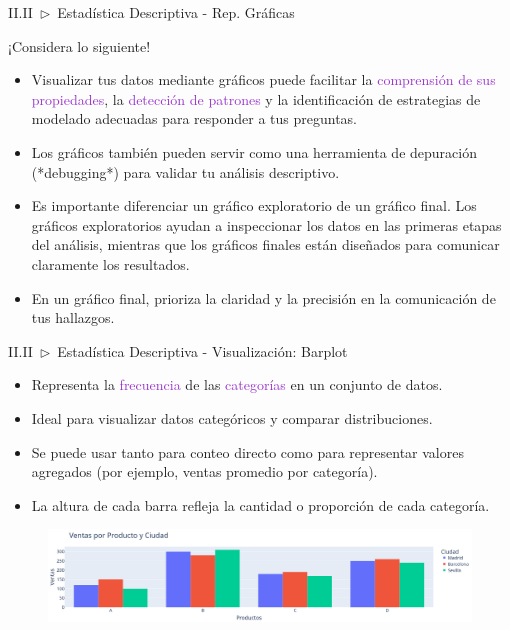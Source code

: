 \documentclass[xcolor=dvipsnames]{beamer}
\begin{document}
    \begin{frame}{II.II~$\rhd$~Estadística Descriptiva - Rep. Gráficas}
        \begin{block}{¡Considera lo siguiente!}
            \begin{itemize}
                \item Visualizar tus datos mediante gráficos puede facilitar la \textcolor{DarkOrchid}{comprensión de sus propiedades}, la \textcolor{DarkOrchid}{detección de patrones} y la identificación de estrategias de modelado adecuadas para responder a tus preguntas.
                \item Los gráficos también pueden servir como una herramienta de depuración (*debugging*) para validar tu análisis descriptivo.
                \item Es importante diferenciar un gráfico exploratorio de un gráfico final. Los gráficos exploratorios ayudan a inspeccionar los datos en las primeras etapas del análisis, mientras que los gráficos finales están diseñados para comunicar claramente los resultados.
                \item En un gráfico final, prioriza la claridad y la precisión en la comunicación de tus hallazgos.
            \end{itemize}
        \end{block}
    \end{frame}

    \begin{frame}{II.II~$\rhd$~Estadística Descriptiva - Visualización: Barplot}
        \begin{itemize}
            \item Representa la \textcolor{DarkOrchid}{frecuencia} de las \textcolor{DarkOrchid}{categorías} en un conjunto de datos.
            \item Ideal para visualizar datos categóricos y comparar distribuciones.
            \item Se puede usar tanto para conteo directo como para representar valores agregados (por ejemplo, ventas promedio por categoría).
            \item La altura de cada barra refleja la cantidad o proporción de cada categoría.
        \end{itemize}
        \vspace{5mm}
        \begin{figure}
            \centering
            \includegraphics[width=1\linewidth]{imgs/plots/barplot_01.png}
        \end{figure}
    \end{frame}
\end{document}
